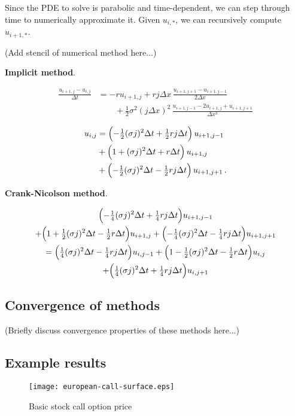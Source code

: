 \documentclass[12pt]{article}
\newcommand{\Dt}{\Delta t}
\newcommand{\Dx}{\Delta x}
\begin{document}
Since the PDE to solve is parabolic and time-dependent,
we can step through time to numerically approximate it.
Given $u_{i,*}$, we can recursively compute $u_{i+1,*}$.

(Add stencil of numerical method here...)

\textbf{Implicit method}.

\begin{align*}
\frac{u_{i+1, j} - u_{i, j}}{\Dt}
&= 
-r u_{i+1,j} + r j \Dx \, \frac{u_{i+1,j+1}- u_{i+1,j-1}}{2\Dx} \\
& \qquad
+ \frac12 \sigma^2 (j \Dx)^2 \, 
\frac{ u_{i+1,j-1} - 2u_{i+1,j} + u_{i+1,j+1}}{\Dx^2}
\end{align*}

\begin{align*}
u_{i, j} &= 
\Bigl( -\tfrac12 (\sigma j)^2 \Dt + \tfrac12 rj \Dt\Bigr) \, u_{i+1,j-1} \\
& +
\Bigl( 1 + (\sigma j)^2 \Dt + r \Dt \Bigr) \, u_{i+1,j} \\
& +
\Bigl( -\tfrac12 (\sigma j)^2 \Dt - \tfrac12 rj \Dt \Bigr) \, u_{i+1,j+1}\,.
\end{align*}

\textbf{Crank-Nicolson method}.

\begin{multline*}
 \Bigl( -\tfrac14 (\sigma j)^2 \Dt + \tfrac14 rj \Dt \Bigr) u_{i+1,j-1} \\
+ \Bigl( 1 + \tfrac12 (\sigma j)^2 \Dt - \tfrac12 r \Dt \Bigr) u_{i+1,j} 
+ \Bigl( -\tfrac14 (\sigma j)^2 \Dt - \tfrac14 rj \Dt \Bigr) u_{i+1,j+1} \\
= \Bigl( \tfrac14 (\sigma j)^2 \Dt - \tfrac14 rj \Dt \Bigr) u_{i,j-1} 
+ \Bigl( 1 - \tfrac12 (\sigma j)^2 \Dt - \tfrac12 r \Dt \Bigr) u_{i,j} \\
+ \Bigl( \tfrac14 (\sigma j)^2 \Dt + \tfrac14 rj \Dt \Bigr) u_{i,j+1}
\end{multline*}

\subsection{Convergence of methods}

(Briefly discuss convergence properties of these methods here...)

\subsection{Example results}

\begin{figure}
\texttt{[image: european-call-surface.eps]}
\caption{Basic stock call option price}
\end{figure}
\end{document}
